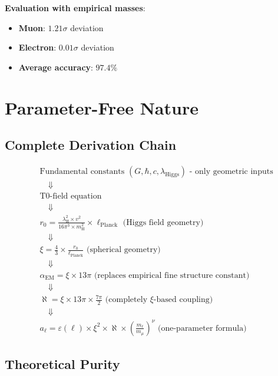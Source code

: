 \documentclass[12pt,a4paper]{article}
\newcommand{\xipar}{\xi}
\newcommand{\alphagem}{\alpha_{\text{EM}}}
\newcommand{\lambdaH}{\lambda_{\text{H}}}
\newcommand{\ellPlanck}{\ell_{\text{Planck}}}
\newcommand{\rzero}{r_0}
\newcommand{\nulep}{\nu}
\newcommand{\epsilonlep}{\varepsilon}
\newcommand{\sigmadev}{\sigma}
\begin{document}
	\textbf{Evaluation with empirical masses}:
	\begin{itemize}
		\item \textbf{Muon}: $1.21\sigmadev$ deviation
		\item \textbf{Electron}: $0.01\sigmadev$ deviation
		\item \textbf{Average accuracy}: $97.4\%$
	\end{itemize}
	
	\section{Parameter-Free Nature}
	
	\subsection{Complete Derivation Chain}
	
	\begin{align}
		&\text{Fundamental constants } (G, \hbar, c, \lambda_{\text{Higgs}}) \text{ - only geometric inputs} \\
		&\quad \Downarrow \\
		&\text{T0-field equation} \\
		&\quad \Downarrow \\
		&\rzero = \frac{\lambdaH^2 \times v^2}{16\pi^3 \times m_{\text{H}}^2} \times \ellPlanck \text{ (Higgs field geometry)} \\
		&\quad \Downarrow \\
		&\xipar = \frac{4}{3} \times \frac{\rzero}{\ellPlanck} \text{ (spherical geometry)} \\
		&\quad \Downarrow \\
		&\alphagem = \xipar \times 13\pi \text{ (replaces empirical fine structure constant)} \\
		&\quad \Downarrow \\
		&\aleph = \xipar \times 13\pi \times \frac{7\pi}{2} \text{ (completely $\xipar$-based coupling)} \\
		&\quad \Downarrow \\
		&a_\ell = \epsilonlep(\ell) \times \xipar^2 \times \aleph \times \left(\frac{m_\ell}{m_\mu}\right)^\nulep \text{ (one-parameter formula)}
	\end{align}
	
	\subsection{Theoretical Purity}
	
\end{document}
